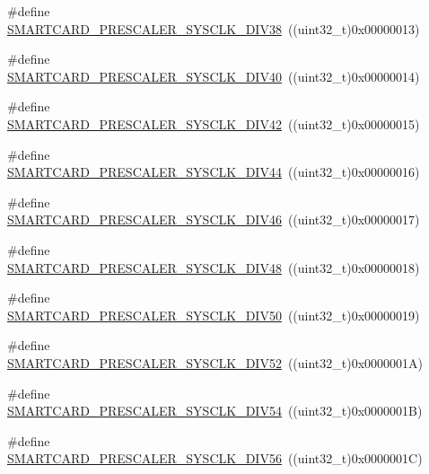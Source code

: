 \begin{DoxyCompactItemize}
\item 
\#define \hyperlink{group___s_m_a_r_t_c_a_r_d___prescaler_gaab1ad3b6e1bcbcb7675a4aff60caeca7}{S\+M\+A\+R\+T\+C\+A\+R\+D\+\_\+\+P\+R\+E\+S\+C\+A\+L\+E\+R\+\_\+\+S\+Y\+S\+C\+L\+K\+\_\+\+D\+I\+V38}~((uint32\+\_\+t)0x00000013)
\item 
\#define \hyperlink{group___s_m_a_r_t_c_a_r_d___prescaler_ga5818073ddf0296d67892c1c0bea7d191}{S\+M\+A\+R\+T\+C\+A\+R\+D\+\_\+\+P\+R\+E\+S\+C\+A\+L\+E\+R\+\_\+\+S\+Y\+S\+C\+L\+K\+\_\+\+D\+I\+V40}~((uint32\+\_\+t)0x00000014)
\item 
\#define \hyperlink{group___s_m_a_r_t_c_a_r_d___prescaler_ga4327bf8a17281766c09f3b4f7578c892}{S\+M\+A\+R\+T\+C\+A\+R\+D\+\_\+\+P\+R\+E\+S\+C\+A\+L\+E\+R\+\_\+\+S\+Y\+S\+C\+L\+K\+\_\+\+D\+I\+V42}~((uint32\+\_\+t)0x00000015)
\item 
\#define \hyperlink{group___s_m_a_r_t_c_a_r_d___prescaler_ga9d7213208083edf0f0d2f69bdf9f3204}{S\+M\+A\+R\+T\+C\+A\+R\+D\+\_\+\+P\+R\+E\+S\+C\+A\+L\+E\+R\+\_\+\+S\+Y\+S\+C\+L\+K\+\_\+\+D\+I\+V44}~((uint32\+\_\+t)0x00000016)
\item 
\#define \hyperlink{group___s_m_a_r_t_c_a_r_d___prescaler_gabfa70d4f896b36ae594b47c53112e0a6}{S\+M\+A\+R\+T\+C\+A\+R\+D\+\_\+\+P\+R\+E\+S\+C\+A\+L\+E\+R\+\_\+\+S\+Y\+S\+C\+L\+K\+\_\+\+D\+I\+V46}~((uint32\+\_\+t)0x00000017)
\item 
\#define \hyperlink{group___s_m_a_r_t_c_a_r_d___prescaler_ga8fed6ad4ae5ca69acc79b3564f9b8761}{S\+M\+A\+R\+T\+C\+A\+R\+D\+\_\+\+P\+R\+E\+S\+C\+A\+L\+E\+R\+\_\+\+S\+Y\+S\+C\+L\+K\+\_\+\+D\+I\+V48}~((uint32\+\_\+t)0x00000018)
\item 
\#define \hyperlink{group___s_m_a_r_t_c_a_r_d___prescaler_gad08451f1bfa7c67c4b73cc4e46c429b7}{S\+M\+A\+R\+T\+C\+A\+R\+D\+\_\+\+P\+R\+E\+S\+C\+A\+L\+E\+R\+\_\+\+S\+Y\+S\+C\+L\+K\+\_\+\+D\+I\+V50}~((uint32\+\_\+t)0x00000019)
\item 
\#define \hyperlink{group___s_m_a_r_t_c_a_r_d___prescaler_ga078695d88dc0dc1e6d37c32de1917379}{S\+M\+A\+R\+T\+C\+A\+R\+D\+\_\+\+P\+R\+E\+S\+C\+A\+L\+E\+R\+\_\+\+S\+Y\+S\+C\+L\+K\+\_\+\+D\+I\+V52}~((uint32\+\_\+t)0x0000001\+A)
\item 
\#define \hyperlink{group___s_m_a_r_t_c_a_r_d___prescaler_ga3aee24421fc68587950a09c4a975d006}{S\+M\+A\+R\+T\+C\+A\+R\+D\+\_\+\+P\+R\+E\+S\+C\+A\+L\+E\+R\+\_\+\+S\+Y\+S\+C\+L\+K\+\_\+\+D\+I\+V54}~((uint32\+\_\+t)0x0000001\+B)
\item 
\#define \hyperlink{group___s_m_a_r_t_c_a_r_d___prescaler_ga6987700cc6e0f27cf4d440e888019666}{S\+M\+A\+R\+T\+C\+A\+R\+D\+\_\+\+P\+R\+E\+S\+C\+A\+L\+E\+R\+\_\+\+S\+Y\+S\+C\+L\+K\+\_\+\+D\+I\+V56}~((uint32\+\_\+t)0x0000001\+C)

\end{DoxyCompactItemize}
